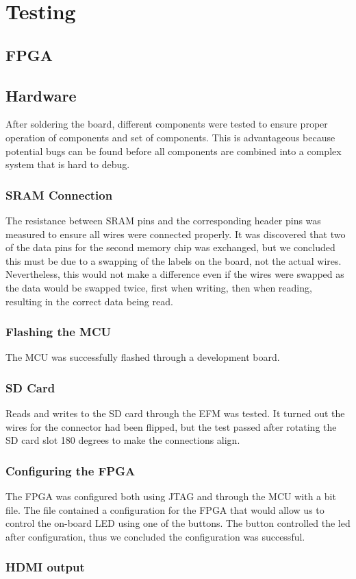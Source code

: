 \section{Testing}


\subsection{FPGA}


\subsection{Hardware}
After soldering the board, different components were tested to ensure proper operation of components and set of components.
This is advantageous because potential bugs can be found before all components are combined into a complex system that is hard to debug.

\subsubsection{SRAM Connection}
The resistance between SRAM pins and the corresponding header pins was measured to ensure all wires were connected properly.
It was discovered that two of the data pins for the second memory chip was exchanged, but we concluded this must be due to a swapping of the labels on the board, not the actual wires.
Nevertheless, this would not make a difference even if the wires were swapped as the data would be swapped twice, first when writing, then when reading, resulting in the correct data being read.

\subsubsection{Flashing the MCU}
The MCU was successfully flashed through a development board.

\subsubsection{SD Card}
Reads and writes to the SD card through the EFM was tested. It turned out the wires for the connector had been flipped, but the test passed after rotating the SD card slot 180 degrees to make the connections align.

\subsubsection{Configuring the FPGA}
The FPGA was configured both using JTAG and through the MCU with a bit file. The file contained a configuration for the FPGA that would allow us to control the on-board LED using one of the buttons. The button controlled the led after configuration, thus we concluded the configuration was successful.

\subsubsection{HDMI output}
